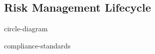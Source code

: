\documentclass[12pt]{article}
\begin{document}
                              \subsection{Risk Management Lifecycle}

                                        \begin{center}
                                                  
                                                  {circle-diagram}

                                         \end{center}


     \nocite{*}
     
     
     
     \cleardoublepage
     
     \appendix
     \appendixpage
     \addappheadtotoc

     {compliance-standards}
     
\end{document}
